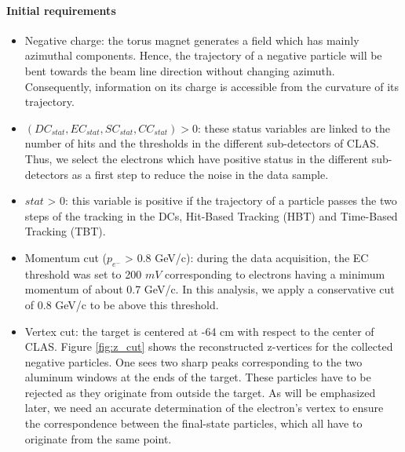\paragraph{Initial requirements}

\begin{itemize}
\item Negative charge: the torus magnet generates a field which has mainly azimuthal components. Hence, the trajectory of a negative particle will be bent towards the beam line direction without changing azimuth. Consequently, information on its charge is accessible from the curvature of its trajectory.           

\item $(DC_{stat}, EC_{stat}, SC_{stat}, CC_{stat}) > 0$: these status variables are linked to the number of hits and the thresholds in the different sub-detectors of CLAS. Thus, we select the electrons which have positive status in the different sub-detectors as a first step to reduce the noise in the data sample.

\item $stat$ > 0: this variable is positive if the trajectory of a particle passes the two steps of the tracking in the DCs, Hit-Based Tracking (HBT) and Time-Based Tracking (TBT).

\item Momentum cut ($p_{e^{-}}$ > 0.8 GeV/c): during the data acquisition, the 
   EC threshold was set to 200 $mV$ corresponding to electrons having a minimum 
   momentum of about 0.7 GeV/c. In this analysis, we apply a conservative cut 
   of 0.8 GeV/c to be above this threshold.

\item Vertex cut: the target is centered at -64 cm with respect to the center of CLAS. Figure \ref{fig:z_cut} shows the reconstructed z-vertices for the collected negative particles. One sees two sharp peaks corresponding to the two aluminum windows at the ends of the target. These particles have to be rejected as they originate from outside the target. As will be emphasized later, we need an accurate determination of the electron's vertex to ensure the correspondence between the final-state particles, which all have to originate from the same point.       
 

\end{itemize}
